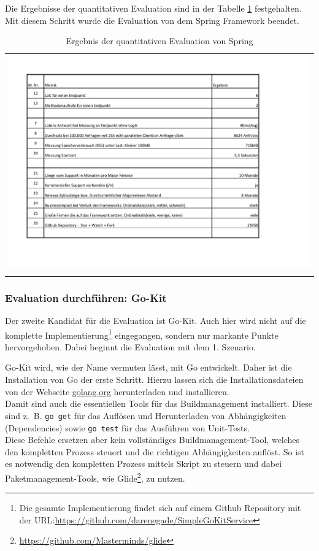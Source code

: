 Die Ergebnisse der quantitativen Evaluation sind in der Tabelle \ref{QuantErgebnisSpring} festgehalten. Mit diesem Schritt wurde die Evaluation von dem Spring Framework beendet.  

\begin{longtable}{c}
	\includegraphics[width=\linewidth]{Bilder/ObjekEvalErgebnisSpring.pdf} \\	
	\caption[Quantitative Evaluation Ergebnis Spring]{Ergebnis der quantitativen Evaluation von Spring}
	\label{QuantErgebnisSpring}\\
\end{longtable}
\FloatBarrier

\subsubsection{Evaluation durchführen: Go-Kit}
Der zweite Kandidat für die Evaluation ist Go-Kit. Auch hier wird nicht auf die komplette Implementierung\footnote{
	Die gesamte Implementierung findet sich auf einem Github Repository mit der URL:\url{https://github.com/darenegade/SimpleGoKitService}
} 
eingegangen, sondern nur markante Punkte hervorgehoben. Dabei beginnt die Evaluation mit dem 1. Szenario.

Go-Kit wird, wie der Name vermuten lässt, mit Go entwickelt. Daher ist die Installation von Go der erste Schritt. Hierzu lassen sich die Installationsdateien von der Webseite \url{golang.org} herunterladen und installieren.\\
Damit sind auch die essentiellen Tools für das Buildmanagement installiert. Diese sind z.~B. \lstinline|go get| für das Auflösen und Herunterladen von Abhängigkeiten (Dependencies) sowie \lstinline|go test| für das Ausführen von Unit-Tests.\\
Diese Befehle ersetzen aber kein vollständiges Buildmanagement-Tool, welches den kompletten Prozess steuert und die richtigen Abhängigkeiten auflöst\cite{GoDep2016}. So ist es notwendig den kompletten Prozess mittels Skript zu steuern und dabei Paketmanagement-Tools, wie Glide\footnote{\url{https://github.com/Masterminds/glide}}, zu nutzen.


